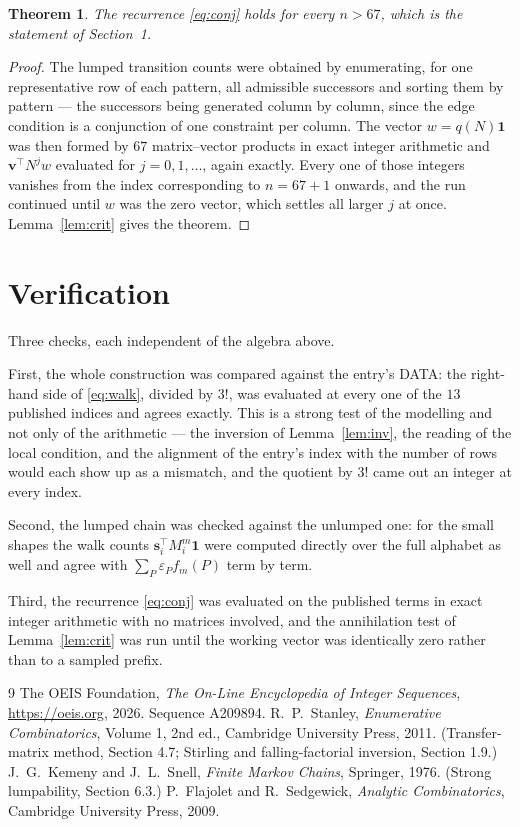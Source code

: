 \documentclass[11pt,a4paper]{article}
\theoremstyle{plain}
\newtheorem{theorem}{Theorem}
\theoremstyle{definition}
\begin{document}
\begin{theorem}
The recurrence \eqref{eq:conj} holds for every $n>67$, which is the statement of
Section~1.
\end{theorem}

\begin{proof}
The lumped transition counts were obtained by enumerating, for one representative row of
each pattern, all admissible successors and sorting them by pattern --- the successors being
generated column by column, since the edge condition is a conjunction of one constraint per
column. The vector $w=q(N)\mathbf{1}$ was then formed by $67$ matrix--vector products
in exact integer arithmetic and $\mathbf{v}^{\!\top}N^{j}w$ evaluated for
$j=0,1,\dots$, again exactly. Every one of those integers vanishes from the index
corresponding to $n=67+1$ onwards, and the run continued until $w$ was the zero vector,
which settles all larger $j$ at once. Lemma~\ref{lem:crit} gives the theorem.
\end{proof}

\section{Verification}

Three checks, each independent of the algebra above.

First, the whole construction was compared against the entry's DATA: the right-hand side of
\eqref{eq:walk}, divided by $3!$, was evaluated at every one of the $13$
published indices and agrees exactly. This is a strong test of the modelling and not only of
the arithmetic --- the inversion of Lemma~\ref{lem:inv}, the reading of the local
condition, and the alignment of the entry's index with the number of rows would each
show up as a mismatch, and the quotient by $3!$ came out an integer at every index.

Second, the lumped chain was checked against the unlumped one: for the small shapes the walk
counts $\mathbf{s}_i^{\!\top}M_i^{m}\mathbf{1}$ were computed directly over the full
alphabet as well and agree with $\sum_P\varepsilon_Pf_m(P)$ term by term.

Third, the recurrence \eqref{eq:conj} was evaluated on the published terms in exact integer
arithmetic with no matrices involved, and the annihilation test of Lemma~\ref{lem:crit} was
run until the working vector was identically zero rather than to a sampled prefix.

\begin{thebibliography}{9}
 The OEIS Foundation, \emph{The On-Line Encyclopedia of Integer
Sequences}, \url{https://oeis.org}, 2026. Sequence A209894.
 R.~P.~Stanley, \emph{Enumerative Combinatorics}, Volume 1, 2nd ed.,
Cambridge University Press, 2011. (Transfer-matrix method, Section 4.7; Stirling and
falling-factorial inversion, Section 1.9.)
 J.~G.~Kemeny and J.~L.~Snell, \emph{Finite Markov Chains}, Springer,
1976. (Strong lumpability, Section 6.3.)
 P.~Flajolet and R.~Sedgewick, \emph{Analytic Combinatorics}, Cambridge
University Press, 2009.
\end{thebibliography}
\end{document}
